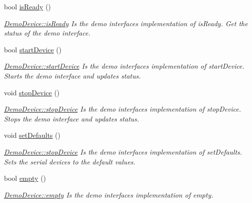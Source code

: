 \begin{DoxyCompactItemize}
bool \hyperlink{class_demo_device_aaadb9ced56699af55526b9fc7cf8420c}{is\+Ready} ()
\begin{DoxyCompactList}\small\item\em \hyperlink{class_demo_device_aaadb9ced56699af55526b9fc7cf8420c}{Demo\+Device\+::is\+Ready} Is the demo interface\textquotesingle{}s implementation of is\+Ready. Get the status of the demo interface. \end{DoxyCompactList}\item 
bool \hyperlink{class_demo_device_af350ecf6ff289983cff9053197f1b1f2}{start\+Device} ()
\begin{DoxyCompactList}\small\item\em \hyperlink{class_demo_device_af350ecf6ff289983cff9053197f1b1f2}{Demo\+Device\+::start\+Device} Is the demo interface\textquotesingle{}s implementation of start\+Device. Starts the demo interface and updates status. \end{DoxyCompactList}\item 
\hypertarget{class_demo_device_ab95434f7121f00789108f29a8457ec98}{}\label{class_demo_device_ab95434f7121f00789108f29a8457ec98} 
void \hyperlink{class_demo_device_ab95434f7121f00789108f29a8457ec98}{stop\+Device} ()
\begin{DoxyCompactList}\small\item\em \hyperlink{class_demo_device_ab95434f7121f00789108f29a8457ec98}{Demo\+Device\+::stop\+Device} Is the demo interface\textquotesingle{}s implementation of stop\+Device. Stops the demo interface and updates status. \end{DoxyCompactList}\item 
\hypertarget{class_demo_device_a79a9c22e60aca99c7667990bedc461c8}{}\label{class_demo_device_a79a9c22e60aca99c7667990bedc461c8} 
void \hyperlink{class_demo_device_a79a9c22e60aca99c7667990bedc461c8}{set\+Defaults} ()
\begin{DoxyCompactList}\small\item\em \hyperlink{class_demo_device_ab95434f7121f00789108f29a8457ec98}{Demo\+Device\+::stop\+Device} Is the demo interface\textquotesingle{}s implementation of set\+Defaults. Sets the serial devices to the default values. \end{DoxyCompactList}\item 
bool \hyperlink{class_demo_device_a52de363ec31fdbb540cf7cae6f584d22}{empty} ()
\begin{DoxyCompactList}\small\item\em \hyperlink{class_demo_device_a52de363ec31fdbb540cf7cae6f584d22}{Demo\+Device\+::empty} Is the demo interface\textquotesingle{}s implementation of empty. \end{DoxyCompactList}\item 

\end{DoxyCompactItemize}

